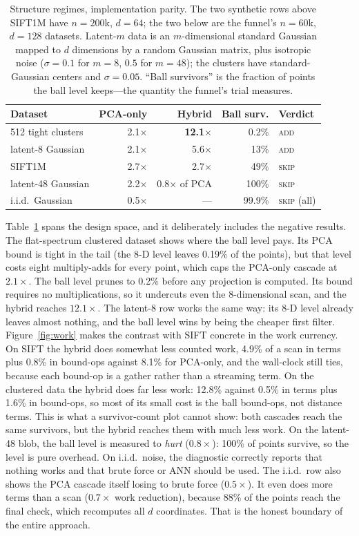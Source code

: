 \documentclass[sigconf, nonacm]{acmart}
\begin{document}
\begin{table}[t]
\caption{Structure regimes, implementation parity. The two synthetic rows
above SIFT1M have $n=200$k, $d=64$; the two below are the funnel's
$n=60$k, $d=128$ datasets. Latent-$m$ data is an $m$-dimensional standard
Gaussian mapped to $d$ dimensions by a random Gaussian matrix, plus
isotropic noise ($\sigma=0.1$ for $m=8$, $0.5$ for $m=48$); the clusters
have standard-Gaussian centers and $\sigma=0.05$. ``Ball survivors'' is
the fraction of points the ball level keeps---the quantity the funnel's
trial measures.}
\label{tab:regimes}
\small
\begin{tabular}{@{}lrrrl@{}}
\toprule
Dataset & PCA-only & Hybrid & Ball surv. & Verdict \\
\midrule
512 tight clusters & 2.1$\times$ & \textbf{12.1$\times$} & 0.2\% & \textsc{add} \\
latent-8 Gaussian & 2.1$\times$ & 5.6$\times$ & 13\% & \textsc{add} \\
SIFT1M & 2.7$\times$ & 2.7$\times$ & 49\% & \textsc{skip} \\
latent-48 Gaussian & 2.2$\times$ & 0.8$\times$ of PCA & 100\% & \textsc{skip} \\
i.i.d.\ Gaussian & 0.5$\times$ & --- & 99.9\% & \textsc{skip} (all) \\
\bottomrule
\end{tabular}
\end{table}

Table~\ref{tab:regimes} spans the design space, and it deliberately
includes the negative results. The flat-spectrum clustered dataset shows
where the ball level pays. Its PCA bound is tight in the tail (the 8-D
level leaves 0.19\% of the points), but that level costs eight
multiply-adds for every point, which caps the PCA-only cascade at
$2.1\times$. The ball level prunes to 0.2\% before any projection is
computed. Its bound requires no multiplications, so it undercuts even the
8-dimensional scan, and the hybrid reaches $12.1\times$. The latent-8
row works the same way: its 8-D level already leaves almost nothing, and
the ball level wins by being the cheaper first filter.
Figure~\ref{fig:work} makes the contrast with SIFT concrete in the work
currency. On SIFT the hybrid does somewhat less counted work, 4.9\% of
a scan in terms plus 0.8\% in bound-ops against 8.1\% for PCA-only, and
the wall-clock still ties, because each bound-op is a gather rather than
a streaming term. On the clustered data the hybrid does far less work:
12.8\% against 0.5\% in terms plus 1.6\% in bound-ops, so
most of its small cost is the ball bound-ops, not distance terms. This is what a survivor-count plot cannot
show: both cascades reach the same survivors, but the hybrid reaches them
with much less work.
On the latent-48 blob, the ball level is measured to \emph{hurt}
($0.8\times$): 100\% of points survive, so the level is pure overhead. On
i.i.d.\ noise, the diagnostic correctly reports that nothing works and
that brute force or ANN should be used. The i.i.d.\ row also shows the
PCA cascade itself losing to brute force ($0.5\times$). It even does more
terms than a scan ($0.7\times$ work reduction), because 88\% of the
points reach the final check, which recomputes all $d$ coordinates. That is
the honest boundary of the entire approach.
\end{document}
